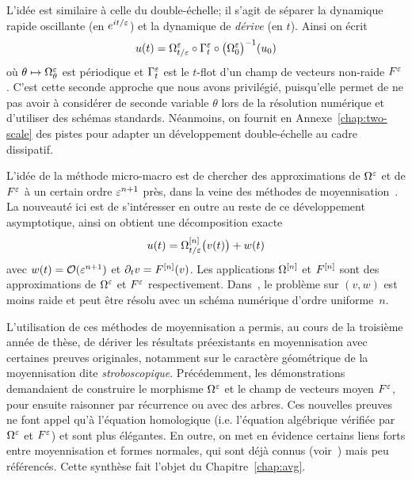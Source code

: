 %
%
L'idée est similaire à celle du double-échelle; il s'agit de séparer la dynamique rapide oscillante (en $e^{it/\varepsilon}$) et la dynamique de \textit{dérive} (en $t$). Ainsi on écrit 
\begin{equation*}
    u(t) = \Omega^{\varepsilon}_{t/\varepsilon} \circ \Gamma^{\varepsilon}_t \circ \big( \Omega^{\varepsilon}_0 \big)^{-1} (u_0)
\end{equation*}
où $\theta \mapsto \Omega^{\varepsilon}_\theta$ est périodique et $\Gamma^{\varepsilon}_t$ est le $t$-flot d'un champ de vecteurs non-raide $F^{\varepsilon}$. C'est cette seconde approche que nous avons privilégié, puisqu'elle permet de ne pas avoir à considérer de seconde variable $\theta$ lors de la résolution numérique et d'utiliser des schémas standards. Néanmoins, on fournit en Annexe~\ref{chap:two-scale} des pistes pour adapter un développement double-échelle au cadre dissipatif. 

L'idée de la méthode micro-macro est de chercher des approximations de $\Omega^{\varepsilon}$ et de $F^{\varepsilon}$ à un certain ordre $\varepsilon^{n+1}$ près, dans la veine des méthodes de moyennisation~\cite{perko.1969.higher,lochak.1988.multiphase,sanders.2007.averaging,chartier.2010.higher,chartier.2012.formal,castella.2015.stroboscopic}. La nouveauté ici est de s'intéresser en outre au reste de ce développement asymptotique, ainsi on obtient une décomposition exacte 
\begin{equation*}
    u(t) = \Omega^{[n]}_{t/\varepsilon} \big( v(t) \big) + w(t)
\end{equation*}
avec $w(t) = \mathcal{O}(\varepsilon^{n+1})$ et $\partial_t v = F^{[n]}(v)$. Les applications $\Omega^{[n]}$ et $F^{[n]}$ sont des approximations de $\Omega^{\varepsilon}$ et $F^{\varepsilon}$ respectivement. Dans~\cite{chartier.2020.new}, le problème sur $(v,w)$ est moins raide et peut être résolu avec un schéma numérique d'ordre uniforme~$n$. 


L'utilisation de ces méthodes de moyennisation a permis, au cours de la troisième année de thèse, de dériver les résultats préexistants en moyennisation avec certaines preuves originales, notamment sur le caractère géométrique de la moyennisation dite \textit{stroboscopique}. Précédemment, les démonstrations demandaient de construire le morphisme $\Omega^{\varepsilon}$ et le champ de vecteurs moyen $F^{\varepsilon}$, pour ensuite raisonner par récurrence ou avec des arbres. Ces nouvelles preuves ne font appel qu'à l'équation homologique (i.e. l'équation algébrique vérifiée par $\Omega^{\varepsilon}$ et $F^{\varepsilon}$) et sont plus élégantes. En outre, on met en évidence certains liens forts entre moyennisation et formes normales, qui sont déjà connus (voir~\cite{sanders.2007.averaging}) mais peu référencés. Cette synthèse fait l'objet du Chapitre~\ref{chap:avg}. 


